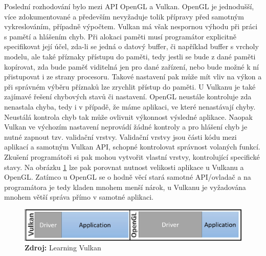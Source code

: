 Poslední rozhodování bylo mezi API OpenGL a Vulkan. OpenGL je jednodušší, více zdokumentované a především nevyžaduje tolik přípravy před samotným vykreslováním, případně výpočtem. Vulkan má však nespornou výhodu při práci s pamětí a hlášením chyb. Při alokaci paměti musí programátor explicitně specifikovat její účel, zda-li se jedná o datový buffer, či například buffer s vrcholy modelu, ale také příznaky přístupu do paměti, tedy jestli se bude z dané paměti kopírovat, zda bude paměť viditelná jen pro dané zařízení, nebo bude možné k ní přistupovat i ze strany procesoru. Takové nastavení pak může mít vliv na výkon a při správném výběru příznaků lze zrychlit přístup do paměti. U Vulkanu je také zajímavé řešení chybových stavů či nastavení. OpenGL neustále kontroluje zda nenastala chyba, tedy i v případě, že máme aplikaci, ve které nenastávají chyby. Neustálá kontrola chyb tak může ovlivnit výkonnost výsledné aplikace. Naopak Vulkan ve výchozím nastavení neprovádí žádné kontroly a pro hlášení chyb je nutné zapnout tzv. validační vrstvy. Validační vrstvy jsou části kódu mezi aplikací a samotným Vulkan API, schopné kontrolovat správnost volaných funkcí. Zkušení programátoři si pak mohou vytvořit vlastní vrstvy, kontrolující specifické stavy. Na obrázku \ref{fig:VulXogl} lze pak porovnat nutnost velikosti aplikace u Vulkanu a OpenGL. Zatímco u OpenGL se o hodně věcí stará samotné API/ovladač a na programátora je tedy kladen mnohem menší nárok, u Vulkanu je vyžadována mnohem větší správa přímo v samotné aplikaci. \cite{singh2016learning} \cite{VulkanTut}

\begin{figure}[hbt]
	\centering
	\captionsetup{justification=centering}
	\includegraphics[scale=0.5]{obrazky-figures/vulkanXogl.jpg}
	\textbf{Zdroj: } Learning Vulkan \cite{singh2016learning}
	\label{fig:VulXogl}
\end{figure}

